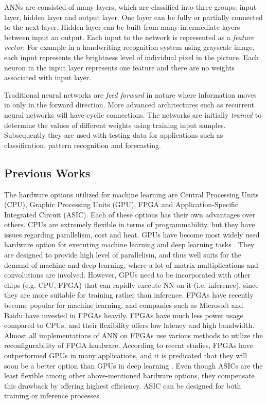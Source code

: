 ANNs are consisted of many layers, which are classified into three groups: input layer, hidden layer and output layer. 
One layer can be fully or partially connected to the next layer. 
Hidden layer can be built from many intermediate layers between input an output.
Each input to the network is represented as a \emph{feature vector}.
For example in a handwriting recognition system using grayscale image, each input represents the brightness level of individual pixel in the picture.
Each neuron in the input layer represents one feature and there are no weights associated with input layer.

Traditional neural networks are \emph{feed forward} in nature where information moves in only in the forward direction.
More advanced architectures such as recurrent neural networks will have cyclic connections.
The networks are initially \emph{trained} to determine the values of different weights using training input samples.
Subsequently they are used with testing data for applications such as classification, pattern recognition and forecasting.

\subsection{Previous Works}

The hardware options utilized for machine learning are Central Processing Units (CPU), Graphic Processing Units (GPU), FPGA and Application-Specific Integrated Circuit (ASIC). Each of these options has their own advantages over others. CPUs are extremely flexible in terms of programmability, but they have issues regarding parallelism, cost and heat. GPUs have become most widely used hardware option for executing machine learning and deep learning tasks \cite{pooja2018}. They are designed to provide high level of parallelism, and thus well suits for the demand of machine and deep learning, where a lot of matrix multiplications and convolutions are involved. However, GPUs need to be incorporated with other chips (e.g. CPU, FPGA) that can rapidly execute NN on it (i.e. inference), since they are more suitable for training rather than inference. FPGAs have recently become popular for machine learning, and companies such as Microsoft and Baidu have invested in FPGAs heavily. FPGAs have much less power usage compared to CPUs, and their flexibility offers low latency and high bandwidth. Almost all implementations of ANN on FPGAs use various methods to utilize the reconfigurability of FPGA hardware. According to recent studies, FPGAs have outperformed GPUs in many applications, and it is predicated that they will soon be a better option than GPUs in deep learning \cite{pooja2018}. Even though ASICs are the least flexible among other above-mentioned hardware options, they compensate this drawback by offering highest efficiency. ASIC can be designed for both training or inference processes. 

